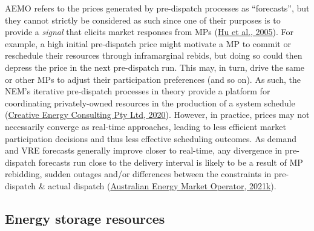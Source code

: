 \documentclass[12pt,a4paper,]{report}
\begin{document}
AEMO refers to the prices generated by pre-dispatch processes as
``forecasts'', but they cannot strictly be considered as such since one
of their purposes is to provide a \emph{signal} that elicits market
responses from MPs
(\protect\hyperlink{ref-huEmpiricalObservationsBidding2005}{Hu et al.,
2005}). For example, a high initial pre-dispatch price might motivate a
MP to commit or reschedule their resources through inframarginal rebids,
but doing so could then depress the price in the next pre-dispatch run.
This may, in turn, drive the same or other MPs to adjust their
participation preferences (and so on). As such, the NEM's iterative
pre-dispatch processes in theory provide a platform for coordinating
privately-owned resources in the production of a system schedule
(\protect\hyperlink{ref-creativeenergyconsultingptyltdSchedulingAheadMarkets2020}{Creative
Energy Consulting Pty Ltd, 2020}). However, in practice, prices may not
necessarily converge as real-time approaches, leading to less efficient
market participation decisions and thus less effective scheduling
outcomes. As demand and VRE forecasts generally improve closer to
real-time, any divergence in pre-dispatch forecasts run close to the
delivery interval is likely to be a result of MP rebidding, sudden
outages and/or differences between the constraints in pre-dispatch \&
actual dispatch
(\protect\hyperlink{ref-australianenergymarketoperatorPredispatchOperatingProcedure2021}{Australian
Energy Market Operator, 2021k}).

\hypertarget{sec:info-context-esr}{%
\subsection{Energy storage resources}\label{sec:info-context-esr}}
\end{document}
